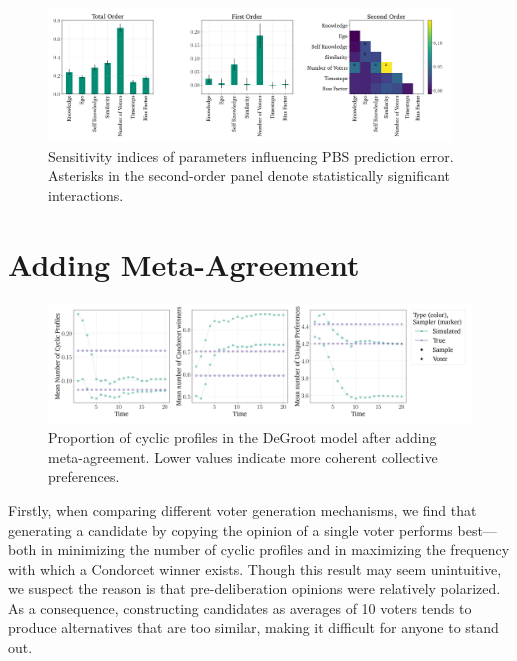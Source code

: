 \documentclass[11pt, oneside, dvipsnames]{Thesis} %
\begin{document}
\begin{figure}[ht]
	\begin{center}
		\includegraphics[width=0.95\textwidth]{Figures/senstivity_analysis.png}
	\end{center}
	\caption{Sensitivity indices of parameters influencing PBS prediction error. Asterisks in the second-order panel denote statistically significant interactions. }\label{fig:sensitivty_pbs}
\end{figure}


\section{Adding Meta-Agreement}

\begin{figure}[htbp]
	\centering
	\centering
	\includegraphics[width=\textwidth]{Figures/three_measures.png
	}
	\caption{Proportion of cyclic profiles in the DeGroot model after adding meta-agreement. Lower values indicate more coherent collective preferences.}
	\label{fig:degroot_cyclic}
\end{figure}

Firstly, when comparing different voter generation mechanisms, we find that generating a candidate by copying the opinion of a single voter performs best—both in minimizing the number of cyclic profiles and in maximizing the frequency with which a Condorcet winner exists. Though this result may seem unintuitive, we suspect the reason is that pre-deliberation opinions were relatively polarized. As a consequence, constructing candidates as averages of 10 voters tends to produce alternatives that are too similar, making it difficult for anyone to stand out.
\end{document}
